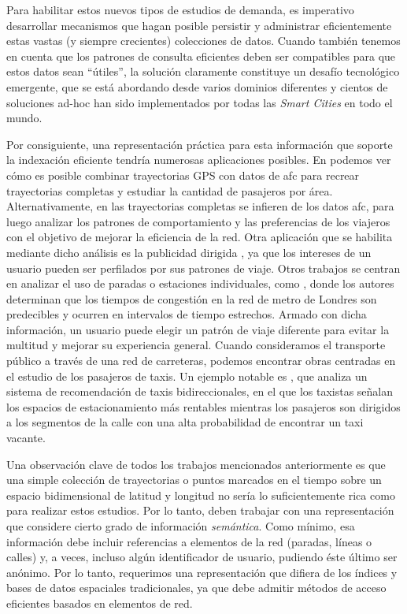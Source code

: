     Para habilitar estos nuevos tipos de estudios de demanda, es imperativo desarrollar mecanismos que hagan posible persistir y administrar eficientemente estas vastas (y siempre crecientes) colecciones de datos. Cuando tambi\'en tenemos en cuenta que los patrones de consulta eficientes deben ser compatibles para que estos datos sean ``\'utiles'', la soluci\'on claramente constituye un desaf\'io tecnol\'ogico emergente, que se est\'a abordando desde varios dominios diferentes y cientos de soluciones ad-hoc han sido implementados por todas las \textit{Smart Cities} en todo el mundo.
    
    Por consiguiente, una representaci\'on pr\'actica para esta informaci\'on que soporte la indexaci\'on eficiente tendr\'ia numerosas aplicaciones posibles. En \cite{tu2018spatial} podemos ver c\'omo es posible combinar trayectorias GPS con datos de \acrfull{afc} para recrear trayectorias completas y estudiar la cantidad de pasajeros por \'area. Alternativamente, en \cite{weng2018mining} las trayectorias completas se infieren de los datos \gls{afc}, para luego analizar los patrones de comportamiento y las preferencias de los viajeros con el objetivo de mejorar la eficiencia de la red. Otra aplicaci\'on que se habilita mediante dicho an\'alisis es la publicidad dirigida \cite{zhang2017targeted}, ya que los intereses de un usuario pueden ser perfilados por sus patrones de viaje. Otros trabajos se centran en analizar el uso de paradas o estaciones individuales, como \cite{ceapa2012avoiding}, donde los autores determinan que los tiempos de congesti\'on en la red de metro de Londres son predecibles y ocurren en intervalos de tiempo estrechos. Armado con dicha informaci\'on, un usuario puede elegir un patr\'on de viaje diferente para evitar la multitud y mejorar su experiencia general. Cuando consideramos el transporte p\'ublico a trav\'es de una red de carreteras, podemos encontrar obras centradas en el estudio de los pasajeros de taxis. Un ejemplo notable es \cite{yuan2013t}, que analiza un sistema de recomendaci\'on de taxis bidireccionales, en el que los taxistas se\~nalan los espacios de estacionamiento m\'as rentables mientras los pasajeros son dirigidos a los segmentos de la calle con una alta probabilidad de encontrar un taxi vacante.
    
    Una observaci\'on clave de todos los trabajos mencionados anteriormente es que una simple colecci\'on de trayectorias o puntos marcados en el tiempo sobre un espacio bidimensional de latitud y longitud no ser\'ia lo suficientemente rica como para realizar estos estudios. Por lo tanto, deben trabajar con una representaci\'on que considere cierto grado de informaci\'on \textit{sem\'antica}. Como m\'inimo, esa informaci\'on debe incluir referencias a elementos de la red (paradas, l\'ineas o calles) y, a veces, incluso alg\'un identificador de usuario, pudiendo \'este \'ultimo ser an\'onimo. Por lo tanto, requerimos una representaci\'on que difiera de los \'indices y bases de datos espaciales tradicionales, ya que debe admitir m\'etodos de acceso eficientes basados en elementos de red.


